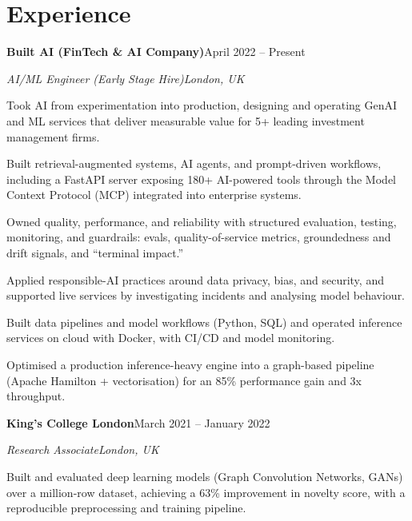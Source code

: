 \documentclass[10pt,a4paper]{article}
\newcommand{\entry}[4]{%
  {\color{company}\bfseries #1}\hfill {\color{muted}#2}\par
  \vspace{1pt}
  {\itshape #3}\hfill {\color{muted}\itshape #4}\par
  \vspace{3pt}%
}
\begin{document}
\section{Experience}
\entry{Built AI (FinTech \& AI Company)}{April 2022 -- Present}{AI/ML Engineer (Early Stage Hire)}{London, UK}
\begin{tight}
  \item Took AI from experimentation into production, designing and operating GenAI and ML services that deliver measurable value for 5+ leading investment management firms.
  \item Built retrieval-augmented systems, AI agents, and prompt-driven workflows, including a FastAPI server exposing 180+ AI-powered tools through the Model Context Protocol (MCP) integrated into enterprise systems.
  \item Owned quality, performance, and reliability with structured evaluation, testing, monitoring, and guardrails: evals, quality-of-service metrics, groundedness and drift signals, and ``terminal impact.''
  \item Applied responsible-AI practices around data privacy, bias, and security, and supported live services by investigating incidents and analysing model behaviour.
  \item Built data pipelines and model workflows (Python, SQL) and operated inference services on cloud with Docker, with CI/CD and model monitoring.
  \item Optimised a production inference-heavy engine into a graph-based pipeline (Apache Hamilton + vectorisation) for an 85\% performance gain and 3x throughput.
\end{tight}

\entry{King's College London}{March 2021 -- January 2022}{Research Associate}{London, UK}
\begin{tight}
  \item Built and evaluated deep learning models (Graph Convolution Networks, GANs) over a million-row dataset, achieving a 63\% improvement in novelty score, with a reproducible preprocessing and training pipeline.
\end{tight}

\end{document}
